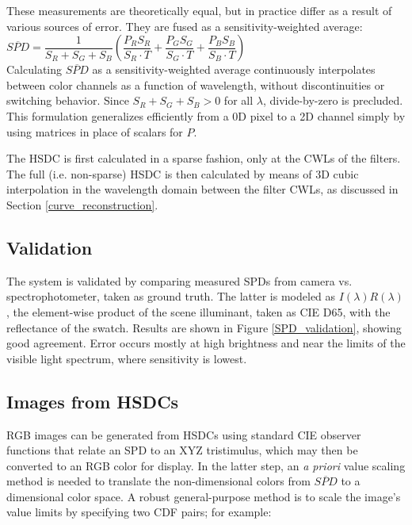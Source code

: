 \documentclass[twocolumn,10pt]{asme2ej}
\newcommand{\id}{\hspace{6 mm}}
\begin{document}
These measurements are theoretically equal, but in practice differ as a result of various sources of error. They are fused as a sensitivity-weighted average: \\

$\overline{SPD} = \dfrac{1}{S_R+S_G+S_B} \left( \dfrac{P_R S_R}{S_R \cdot T} + \dfrac{P_G S_G}{S_G \cdot T} + \dfrac{P_B S_B}{S_B \cdot T} \right)$\\



Calculating $\overline{SPD}$ as a sensitivity-weighted average continuously interpolates between color channels as a function of wavelength, without discontinuities or switching behavior. Since $S_R+S_G+S_B > 0$ for all $\lambda$, divide-by-zero is precluded. This formulation generalizes efficiently from a 0D pixel to a 2D channel simply by using matrices in place of scalars for $P$.

\id The HSDC is first calculated in a sparse fashion, only at the CWLs of the filters. The full (i.e. non-sparse) HSDC is then calculated by means of 3D cubic interpolation in the wavelength domain between the filter CWLs, as discussed in Section \ref{curve_reconstruction}.

\subsection{Validation}

The system is validated by comparing measured SPDs from camera vs. spectrophotometer, taken as ground truth. The latter is modeled as $I(\lambda)R(\lambda)$, the element-wise product of the scene illuminant, taken as CIE D65, with the reflectance of the swatch. Results are shown in Figure \ref{SPD_validation}, showing good agreement. Error occurs mostly at high brightness and near the limits of the visible light spectrum, where sensitivity is lowest.

\subsection{Images from HSDCs}

 RGB images can be generated from HSDCs using standard CIE observer functions that relate an SPD to an XYZ tristimulus, which may then be converted to an RGB color for display. In the latter step, an \emph{a priori} value scaling method is needed to translate the non-dimensional colors from $\overline{SPD}$ to a dimensional color space. A robust general-purpose method is to scale the image's value limits by specifying two CDF pairs; for example:\\
\end{document}
